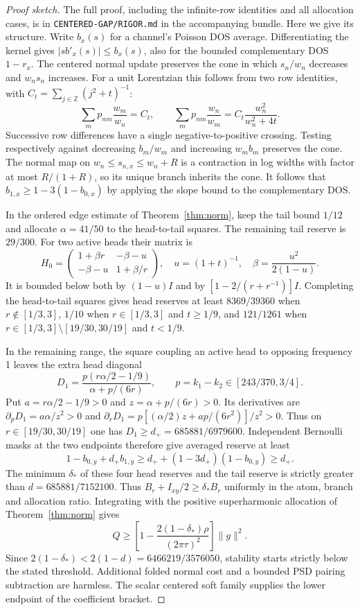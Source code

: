\documentclass[11pt]{article}
\begin{document}
\begin{proof}[Proof sketch]
The full proof, including the infinite-row identities and all allocation cases, is in \texttt{CENTERED-GAP/RIGOR.md} in the accompanying bundle. Here we give its structure. Write $b_x(s)$ for a channel's Poisson DOS average. Differentiating the kernel gives $|s b'_x(s)|\le b_x(s)$, also for the bounded complementary DOS $1-r_x$. The centered normal update preserves the cone in which $s_n/w_n$ decreases and $w_ns_n$ increases. For a unit Lorentzian this follows from two row identities, with $C_t=\sum_{j\in\mathbb Z}(j^2+t)^{-1}$:
\[
 \sum_m p_{nm}\frac{w_m}{w_n}=C_t,\qquad
 \sum_m p_{nm}\frac{w_n}{w_m}=C_t\frac{w_n^2}{w_n^2+4t}.
\]
Successive row differences have a single negative-to-positive crossing. Testing respectively against decreasing $b_m/w_m$ and increasing $w_mb_m$ preserves the cone. The normal map on $w_n\le s_{n,x}\le w_n+R$ is a contraction in log widths with factor at most $R/(1+R)$, so its unique branch inherits the cone. It follows that $b_{1,x}\ge1-3(1-b_{0,x})$ by applying the slope bound to the complementary DOS.

In the ordered edge estimate of Theorem~\ref{thm:norm}, keep the tail bound $1/12$ and allocate $\alpha=41/50$ to the head-to-tail squares. The remaining tail reserve is $29/300$. For two active heads their matrix is
\[
 H_0=\begin{pmatrix}1+\beta r&-\beta-u\\-\beta-u&1+\beta/r\end{pmatrix},
 \quad u=(1+t)^{-1},\quad \beta=\frac{u^2}{2(1-u)}.
\]
It is bounded below both by $(1-u)I$ and by $[1-2/(r+r^{-1})]I$. Completing the head-to-tail squares gives head reserves at least $8369/39360$ when $r\notin[1/3,3]$, $1/10$ when $r\in[1/3,3]$ and $t\ge1/9$, and $121/1261$ when $r\in[1/3,3]\setminus[19/30,30/19]$ and $t<1/9$.

In the remaining range, the square coupling an active head to opposing frequency 1 leaves the extra head diagonal
\[
 D_1=\frac{p(r\alpha/2-1/9)}{\alpha+p/(6r)},\qquad p=k_1-k_2\in[243/370,3/4].
\]
Put $a=r\alpha/2-1/9>0$ and $z=\alpha+p/(6r)>0$. Its derivatives are $\partial_pD_1=a\alpha/z^2>0$ and $\partial_rD_1=p[(\alpha/2)z+ap/(6r^2)]/z^2>0$. Thus on $r\in[19/30,30/19]$ one has $D_1\ge d_+=685881/6979600$. Independent Bernoulli masks at the two endpoints therefore give averaged reserve at least
\[
 1-b_{0,y}+d_+ b_{1,y}\ge d_++(1-3d_+)(1-b_{0,y})\ge d_+.
\]
The minimum $\delta_*$ of these four head reserves and the tail reserve is strictly greater than $d=685881/7152100$. Thus $B_r+I_{xy}/2\ge\delta_* B_r$ uniformly in the atom, branch and allocation ratio. Integrating with the positive superharmonic allocation of Theorem~\ref{thm:norm} gives
\[
 Q\ge\left[1-\frac{2(1-\delta_*)\rho}{(2\pi\tau)^2}\right]\|g\|^2.
\]
Since $2(1-\delta_*)<2(1-d)=6466219/3576050$, stability starts strictly below the stated threshold. Additional folded normal cost and a bounded PSD pairing subtraction are harmless. The scalar centered soft family supplies the lower endpoint of the coefficient bracket.
\end{proof}
\end{document}
